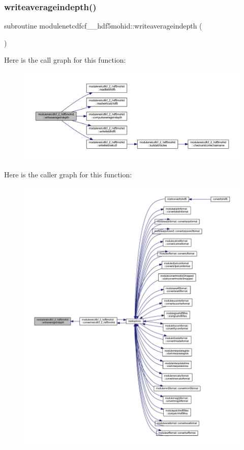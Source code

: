 \subsubsection{\texorpdfstring{writeaverageindepth()}{writeaverageindepth()}}
{\footnotesize\ttfamily subroutine modulenetcdfcf\+\_\+\_\+hdf5mohid\+::writeaverageindepth (\begin{DoxyParamCaption}{ }\end{DoxyParamCaption})\hspace{0.3cm}{\ttfamily [private]}}

Here is the call graph for this function\+:\nopagebreak
\begin{figure}[H]
\begin{center}
\leavevmode
\includegraphics[width=350pt]{namespacemodulenetcdfcf__2__hdf5mohid_a31008b878c995f8aa06a2f70557abc17_cgraph}
\end{center}
\end{figure}
Here is the caller graph for this function\+:\nopagebreak
\begin{figure}[H]
\begin{center}
\leavevmode
\includegraphics[width=350pt]{namespacemodulenetcdfcf__2__hdf5mohid_a31008b878c995f8aa06a2f70557abc17_icgraph}
\end{center}
\end{figure}
